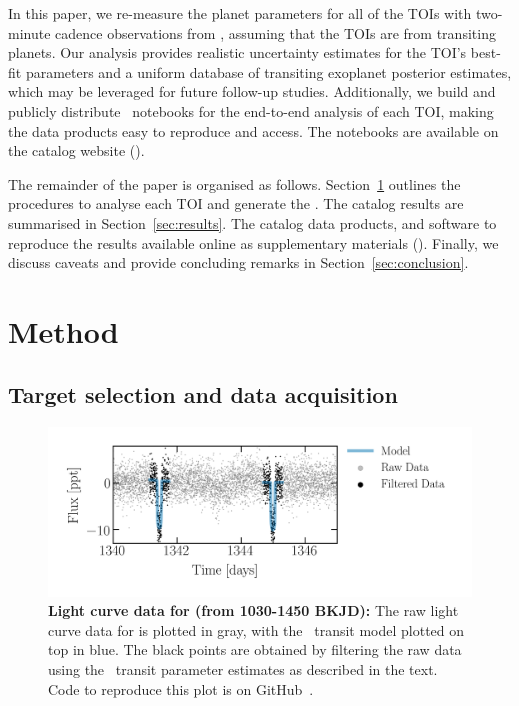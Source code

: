 \documentclass[floatfix,ApJL,twocolumn]{aastex631}
\begin{document}
In this paper, we re-measure the planet parameters for all \red{\numAnalysed} of the TOIs with two-minute cadence observations from , assuming that the TOIs are from transiting planets.
Our analysis provides realistic uncertainty estimates for the TOI's best-fit parameters and a uniform database of transiting exoplanet posterior estimates, which may be leveraged for future follow-up studies.
Additionally, we build and publicly distribute \jupyter\ notebooks for the end-to-end analysis of each TOI, making the data products easy to reproduce and access. 
The notebooks are available on the catalog website (\atlasUrl).

The remainder of the paper is organised as follows. 
Section~\ref{sec:method} outlines the procedures to analyse each TOI and generate the \tessAtlas.
The catalog results are summarised in Section~\ref{sec:results}.
The catalog data products, and software to reproduce the results available online as supplementary materials (\atlasUrl).
Finally, we discuss caveats and provide concluding remarks in Section~\ref{sec:conclusion}.

\section{Method} \label{sec:method}

\subsection{Target selection and data acquisition}
\begin{figure}
    \includegraphics[width=\linewidth]{figures/raw_data_toi_103.png}
    \caption{\textbf{Light curve data for  (from 1030-1450 BKJD):} The raw light curve data for  is plotted in gray, with the \exofop\ transit model plotted on top in blue. The black points are obtained by filtering the raw data using the \exofop\ transit parameter estimates as described in the text. Code to reproduce this plot is on GitHub~\paperPlotsLink.}
    \label{fig:raw}
\end{figure}
\end{document}
